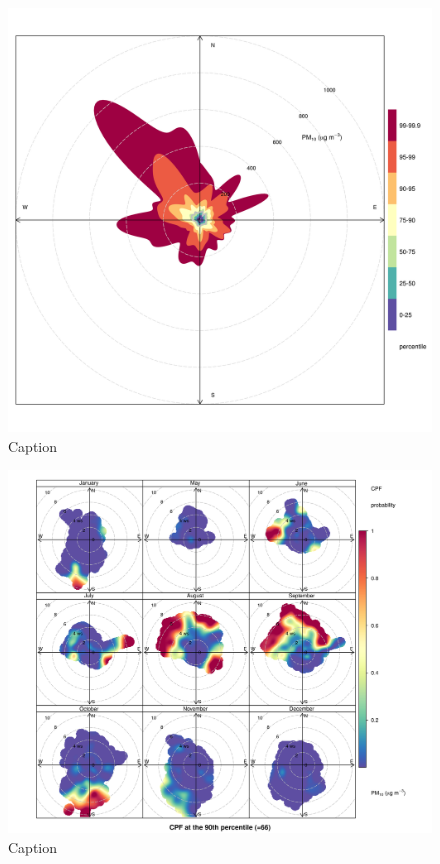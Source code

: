 \documentclass{nwureport}
\begin{document}
\begin{figure}[!htb]
    \centering
    \includegraphics[width=\textwidth]{images/Wedela_pm10_percentileRose.png}
    \caption{Caption}
    \label{fig:summary}
\end{figure}

\begin{figure}[!htb]
    \centering
    \includegraphics[width=\textwidth]{images/Wedela_pm10_polar.png}
    \caption{Caption}
    \label{fig:summary}
\end{figure}
\end{document}
